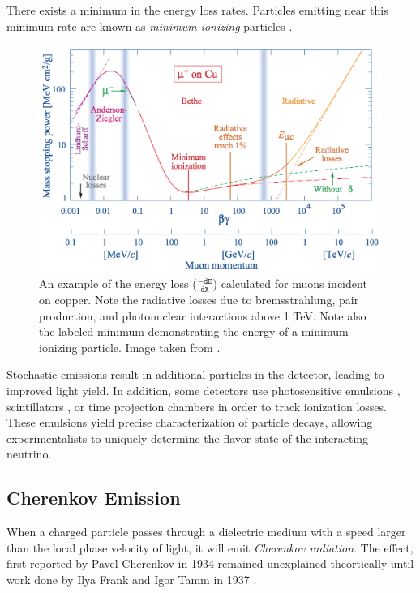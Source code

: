 There exists a minimum in the energy loss rates.
Particles emitting near this minimum rate are known as \emph{minimum-ionizing} particles \cite{PDG-2015}.

\begin{figure}
\centering
\includegraphics[width=0.8\linewidth]{bethe_bloche-PDG15.png}
\caption{An example of the energy loss ($\mathtt{\frac{-dE}{dX}}$) calculated for muons incident on copper. Note the radiative losses due to bremsstrahlung, pair production, and photonuclear interactions above 1 TeV. Note also the labeled minimum demonstrating the energy of a minimum ionizing particle. Image taken from \cite{PDG-2015}.}
\label{fig:discrete_emissions}
\end{figure}

Stochastic emissions result in additional particles in the detector, leading to improved light yield.
In addition, some detectors use photosensitive emulsions  \cite{Description-OPERA, DONUT-2001}, scintillators \cite{Description-MINOS, Description-NOvA, Description-MINERvA, Description-T2K}, or time projection chambers \cite{Description-ICARUS2} in order to track ionization losses.
These emulsions yield precise characterization of particle decays, allowing experimentalists to uniquely determine the flavor state of the interacting neutrino.

\subsection{Cherenkov Emission}
When a charged particle passes through a dielectric medium with a speed larger than the local phase velocity of light, it will emit \emph{Cherenkov radiation}\cite{Cherenkov-Radiation-Confirmation}.
The effect, first reported by Pavel Cherenkov in 1934 \cite{Cherenkov-Radiation-Observation} remained unexplained theortically until work done by Ilya Frank and Igor Tamm in 1937 \cite{Frank-Tamm}.

